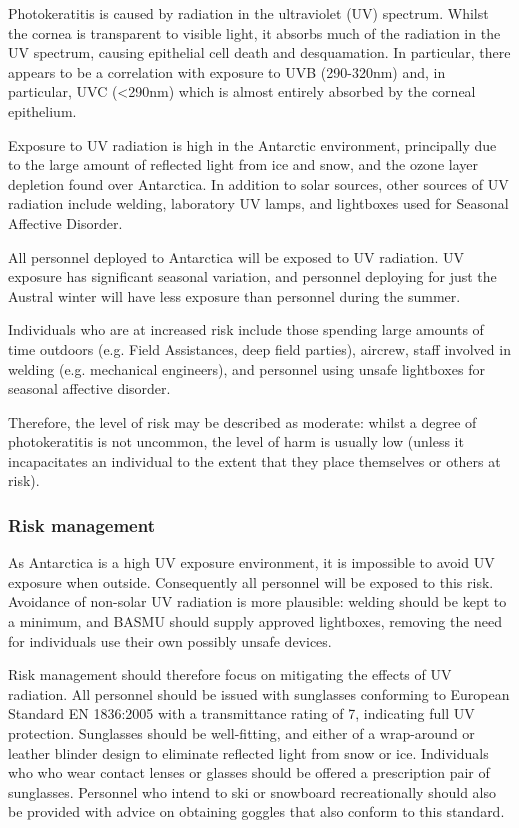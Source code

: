 \documentclass[12pt,a4paper]{article}
\begin{document}
Photokeratitis is caused by radiation in the ultraviolet (UV) spectrum. Whilst the cornea is transparent to visible light, it absorbs much of the radiation in the UV spectrum, causing epithelial cell death and desquamation. In particular, there appears to be a correlation with exposure to UVB (290-320nm) and, in particular, UVC (<290nm) which is almost entirely absorbed by the corneal epithelium.

Exposure to UV radiation is high in the Antarctic environment, principally due to the large amount of reflected light from ice and snow, and the ozone layer depletion found over Antarctica.\cite{Farman:1985uf} In addition to solar sources, other sources of UV radiation include welding, laboratory UV lamps, and lightboxes used for Seasonal Affective Disorder.

All personnel deployed to Antarctica will be exposed to UV radiation. UV exposure has significant seasonal variation, and personnel deploying for just the Austral winter will have less exposure than personnel during the summer.\cite{Puskeppeleit:1992uv}

Individuals who are at increased risk include those spending large amounts of time outdoors (e.g. Field Assistances, deep field parties),\cite{Moehrle:2003cn} aircrew, staff involved in welding (e.g. mechanical engineers), and personnel using unsafe lightboxes for seasonal affective disorder.

Therefore, the level of risk may be described as moderate: whilst a degree of photokeratitis is not uncommon, the level of harm is usually low (unless it incapacitates an individual to the extent that they place themselves or others at risk).

\subsubsection{Risk management}

As Antarctica is a high UV exposure environment, it is impossible to avoid UV exposure when outside. Consequently all personnel will be exposed to this risk. Avoidance of non-solar UV radiation is more plausible: welding should be kept to a minimum, and BASMU should supply approved lightboxes, removing the need for individuals use their own possibly unsafe devices.

Risk management should therefore focus on mitigating the effects of UV radiation. All personnel should be issued with sunglasses conforming to European Standard EN 1836:2005 with a transmittance rating of 7, indicating full UV protection. Sunglasses should be well-fitting, and either of a wrap-around or leather blinder design to eliminate reflected light from snow or ice. Individuals who who wear contact lenses or glasses should be offered a prescription pair of sunglasses. Personnel who intend to ski or snowboard recreationally should also be provided with advice on obtaining goggles that also conform to this standard.
\end{document}
